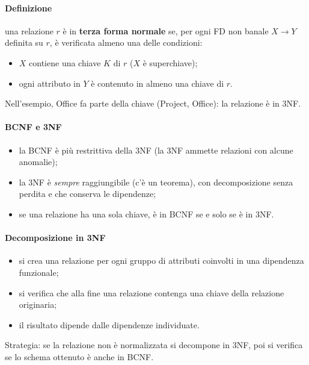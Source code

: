 \documentclass[a4paper,12pt]{article}
\begin{document}
\paragraph{Definizione} una relazione $r$ è in \textbf{terza forma normale}
se, per ogni FD non banale $X \to Y$ definita su $r$, è verificata almeno una
delle condizioni:
\begin{itemize}
  \item $X$ contiene una chiave $K$ di $r$ ($X$ è superchiave);
  \item ogni attributo in $Y$ è contenuto in almeno una chiave di $r$.
\end{itemize}
Nell'esempio, Office fa parte della chiave (Project, Office): la relazione è
in 3NF.

\paragraph{BCNF e 3NF}
\begin{itemize}
  \item la BCNF è più restrittiva della 3NF (la 3NF ammette relazioni con
    alcune anomalie);
  \item la 3NF è \emph{sempre} raggiungibile (c'è un teorema), con
    decomposizione senza perdita e che conserva le dipendenze;
  \item se una relazione ha una sola chiave, è in BCNF se e solo se è in 3NF.
\end{itemize}

\paragraph{Decomposizione in 3NF}
\begin{itemize}
  \item si crea una relazione per ogni gruppo di attributi coinvolti in una
    dipendenza funzionale;
  \item si verifica che alla fine una relazione contenga una chiave della
    relazione originaria;
  \item il risultato dipende dalle dipendenze individuate.
\end{itemize}
Strategia: se la relazione non è normalizzata si decompone in 3NF, poi si
verifica se lo schema ottenuto è anche in BCNF.
\end{document}
